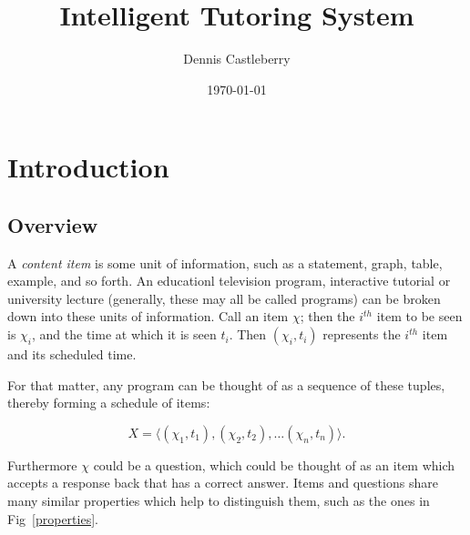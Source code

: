 \documentclass{article}
\title{Intelligent Tutoring System}
\author{Dennis Castleberry}
\date{\today}
\begin{document}
\maketitle


\setlength{\parindent}{0pt}
\setlength{\parskip}{4pt}

\section{Introduction}

\subsection{Overview}

A \emph{content item} is some unit of information, such as a statement, graph,
table, example, and so forth.  An educationl television program, interactive
tutorial or university lecture (generally, these may all be called programs)
can be broken down into these units of information.  Call an item $\chi$; then
the $i^{th}$ item to be seen is $\chi_i$, and the time at which it is seen
$t_i$.  Then $(\chi_i, t_i)$ represents the $i^{th}$ item and its scheduled
time.  

For that matter, any program can be thought of as a sequence of these tuples,
thereby forming a schedule of items: 

 \begin{equation}
   X = \langle (\chi_1, t_1), (\chi_2, t_2), \ldots (\chi_n, t_n) \rangle.
 \end{equation}
 \vspace{2pt}

Furthermore $\chi$ could be a question, which could be thought of as an item
which accepts a response back that has a correct answer.  Items and questions
share many similar properties which help to distinguish them, such as the
ones in Fig~\ref{properties}.
\end{document}

